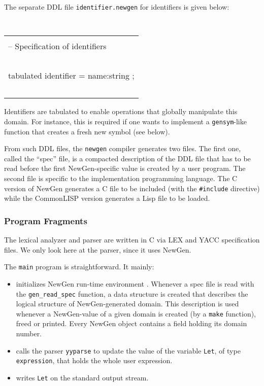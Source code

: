 The separate DDL file {\tt identifier.newgen} for identifiers is given
below:

{\tt
\begin{center}
\begin{tabular}{|l|}
\hline \\
-- Specification of identifiers \\
~\\
tabulated identifier = name:string ; \\
~\\
\hline
\end{tabular}
\end{center}
}

Identifiers are tabulated to enable operations that globally manipulate
this domain. For instance, this is required if one wants to implement a
{\tt gensym}-like function that creates a fresh new symbol (see below).

From such DDL files, the {\tt newgen} compiler generates two files. The
first one, called the ``spec'' file, is a compacted description of the
DDL file that has to be read before the first NewGen-specific value is
created by a user program. The second file is specific to the
implementation programming language. The C version of NewGen generates a
C file to be included (with the {\tt \#include} directive) while the
CommonLISP version generates a Lisp file to be loaded.

\subsubsection*{Program Fragments}

The lexical analyzer and parser are written in C via LEX and YACC
specification files. We only look here at the parser, since it uses
NewGen.

The {\tt main} program is straightforward. It mainly:
\begin{itemize}
\item
        initializes NewGen run-time environment . Whenever a spec file
is read with the {\tt gen\_read\_spec} function, a data structure is
created that describes the logical structure of NewGen-generated domain.
This description is used whenever a NewGen-value of a given domain is
created (by a {\tt make} function), freed or printed. Every NewGen
object contains a field holding its domain number.
\item
        calls the parser {\tt yyparse} to update the value of the
variable {\tt Let}, of type {\tt expression}, that holds the whole user
expression.
\item
        writes {\tt Let} on the standard output stream.
\end{itemize}


